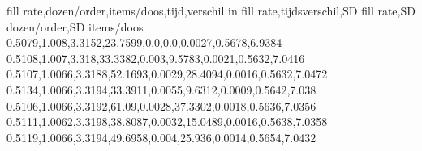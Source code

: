 fill rate,dozen/order,items/doos,tijd,verschil in fill rate,tijdsverschil,SD fill rate,SD dozen/order,SD items/doos
0.5079,1.008,3.3152,23.7599,0.0,0.0,0.0027,0.5678,6.9384
0.5108,1.007,3.318,33.3382,0.003,9.5783,0.0021,0.5632,7.0416
0.5107,1.0066,3.3188,52.1693,0.0029,28.4094,0.0016,0.5632,7.0472
0.5134,1.0066,3.3194,33.3911,0.0055,9.6312,0.0009,0.5642,7.038
0.5106,1.0066,3.3192,61.09,0.0028,37.3302,0.0018,0.5636,7.0356
0.5111,1.0062,3.3198,38.8087,0.0032,15.0489,0.0016,0.5638,7.0358
0.5119,1.0066,3.3194,49.6958,0.004,25.936,0.0014,0.5654,7.0432
